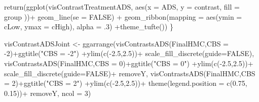 \documentclass[
  10pt,
  dvipsnames,enabledeprecatedfontcommands]{scrartcl}
\newenvironment{Shaded}{\begin{snugshade}}{\end{snugshade}}
\newcommand{\AttributeTok}[1]{\textcolor[rgb]{0.77,0.63,0.00}{#1}}
\newcommand{\ConstantTok}[1]{\textcolor[rgb]{0.00,0.00,0.00}{#1}}
\newcommand{\DecValTok}[1]{\textcolor[rgb]{0.00,0.00,0.81}{#1}}
\newcommand{\FloatTok}[1]{\textcolor[rgb]{0.00,0.00,0.81}{#1}}
\newcommand{\FunctionTok}[1]{\textcolor[rgb]{0.00,0.00,0.00}{#1}}
\newcommand{\NormalTok}[1]{#1}
\newcommand{\OtherTok}[1]{\textcolor[rgb]{0.56,0.35,0.01}{#1}}
\newcommand{\SpecialCharTok}[1]{\textcolor[rgb]{0.00,0.00,0.00}{#1}}
\newcommand{\StringTok}[1]{\textcolor[rgb]{0.31,0.60,0.02}{#1}}
\begin{document}
\begin{Shaded}
\begin{Highlighting}[]
  \FunctionTok{return}\NormalTok{(}\FunctionTok{ggplot}\NormalTok{(visContrastTreatmentADS, }\FunctionTok{aes}\NormalTok{(}\AttributeTok{x =}\NormalTok{ ADS, }\AttributeTok{y =}\NormalTok{ contrast, }\AttributeTok{fill =}\NormalTok{ group ))}\SpecialCharTok{+}
           \FunctionTok{geom\_line}\NormalTok{(}\AttributeTok{se =} \ConstantTok{FALSE}\NormalTok{) }\SpecialCharTok{+}
  \FunctionTok{geom\_ribbon}\NormalTok{(}\AttributeTok{mapping =} \FunctionTok{aes}\NormalTok{(}\AttributeTok{ymin =}\NormalTok{ cLow, }\AttributeTok{ymax =}\NormalTok{ cHigh), }
       \AttributeTok{alpha =}\NormalTok{ .}\DecValTok{3}\NormalTok{) }\SpecialCharTok{+}\FunctionTok{theme\_tufte}\NormalTok{())}
\NormalTok{\}}



\NormalTok{visContrastADSJoint }\OtherTok{\textless{}{-}} \FunctionTok{ggarrange}\NormalTok{(}\FunctionTok{visContrastsADS}\NormalTok{(FinalHMC,}\AttributeTok{CBS =} \SpecialCharTok{{-}}\DecValTok{2}\NormalTok{)}\SpecialCharTok{+}\FunctionTok{ggtitle}\NormalTok{(}\StringTok{"CBS = {-}2"}\NormalTok{)}
                                 \SpecialCharTok{+}\FunctionTok{ylim}\NormalTok{(}\FunctionTok{c}\NormalTok{(}\SpecialCharTok{{-}}\FloatTok{2.5}\NormalTok{,}\FloatTok{2.5}\NormalTok{))}\SpecialCharTok{+} \FunctionTok{scale\_fill\_discrete}\NormalTok{(}\AttributeTok{guide=}\ConstantTok{FALSE}\NormalTok{),}
                                 \FunctionTok{visContrastsADS}\NormalTok{(FinalHMC,}\AttributeTok{CBS =} \DecValTok{0}\NormalTok{)}\SpecialCharTok{+}\FunctionTok{ggtitle}\NormalTok{(}\StringTok{"CBS = 0"}\NormalTok{)}
                                 \SpecialCharTok{+}\FunctionTok{ylim}\NormalTok{(}\FunctionTok{c}\NormalTok{(}\SpecialCharTok{{-}}\FloatTok{2.5}\NormalTok{,}\FloatTok{2.5}\NormalTok{))}\SpecialCharTok{+} \FunctionTok{scale\_fill\_discrete}\NormalTok{(}\AttributeTok{guide=}\ConstantTok{FALSE}\NormalTok{)}\SpecialCharTok{+}
\NormalTok{                                   removeY,}
                                 \FunctionTok{visContrastsADS}\NormalTok{(FinalHMC,}\AttributeTok{CBS =} \DecValTok{2}\NormalTok{)}\SpecialCharTok{+}\FunctionTok{ggtitle}\NormalTok{(}\StringTok{"CBS = 2"}\NormalTok{)}
                                 \SpecialCharTok{+}\FunctionTok{ylim}\NormalTok{(}\FunctionTok{c}\NormalTok{(}\SpecialCharTok{{-}}\FloatTok{2.5}\NormalTok{,}\FloatTok{2.5}\NormalTok{))}\SpecialCharTok{+}
                                   \FunctionTok{theme}\NormalTok{(}\AttributeTok{legend.position =} \FunctionTok{c}\NormalTok{(}\FloatTok{0.75}\NormalTok{, }\FloatTok{0.15}\NormalTok{))}\SpecialCharTok{+}
\NormalTok{                                   removeY, }\AttributeTok{ncol =} \DecValTok{3}\NormalTok{)}


\end{Highlighting}
\end{Shaded}
\end{document}
